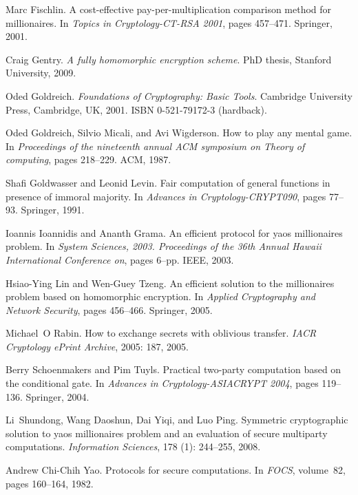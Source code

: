 \documentclass[11pt, letterpaper, romanappendices, onecolumn]{article}
\theoremstyle{plain}\newtheorem{thm}{Theorem}[section]
\theoremstyle{definition}
\theoremstyle{remark}
\begin{document}
\begin{thebibliography}{18}
Marc Fischlin.
\newblock A cost-effective pay-per-multiplication comparison method for
  millionaires.
\newblock In \emph{Topics in Cryptology-CT-RSA 2001}, pages 457--471. Springer,
  2001.

Craig Gentry.
\newblock \emph{A fully homomorphic encryption scheme}.
\newblock PhD thesis, Stanford University, 2009.

Oded Goldreich.
\newblock \emph{Foundations of Cryptography: Basic Tools}.
\newblock Cambridge University Press, Cambridge, UK, 2001.
\newblock ISBN 0-521-79172-3 (hardback).

Oded Goldreich, Silvio Micali, and Avi Wigderson.
\newblock How to play any mental game.
\newblock In \emph{Proceedings of the nineteenth annual ACM symposium on Theory
  of computing}, pages 218--229. ACM, 1987.

Shafi Goldwasser and Leonid Levin.
\newblock Fair computation of general functions in presence of immoral
  majority.
\newblock In \emph{Advances in Cryptology-CRYPT090}, pages 77--93.
  Springer, 1991.

Ioannis Ioannidis and Ananth Grama.
\newblock An efficient protocol for yaos millionaires
  problem.
\newblock In \emph{System Sciences, 2003. Proceedings of the 36th Annual Hawaii
  International Conference on}, pages 6--pp. IEEE, 2003.

Hsiao-Ying Lin and Wen-Guey Tzeng.
\newblock An efficient solution to the millionaires problem based on
  homomorphic encryption.
\newblock In \emph{Applied Cryptography and Network Security}, pages 456--466.
  Springer, 2005.

Michael~O Rabin.
\newblock How to exchange secrets with oblivious transfer.
\newblock \emph{IACR Cryptology ePrint Archive}, 2005: 187, 2005.

Berry Schoenmakers and Pim Tuyls.
\newblock Practical two-party computation based on the conditional gate.
\newblock In \emph{Advances in Cryptology-ASIACRYPT 2004}, pages 119--136.
  Springer, 2004.

Li~Shundong, Wang Daoshun, Dai Yiqi, and Luo Ping.
\newblock Symmetric cryptographic solution to yaos
  millionaires problem and an evaluation of secure multiparty
  computations.
\newblock \emph{Information Sciences}, 178 (1): 244--255,
  2008.

Andrew Chi-Chih Yao.
\newblock Protocols for secure computations.
\newblock In \emph{FOCS}, volume~82, pages 160--164, 1982.

\end{thebibliography}
 
\end{document}
